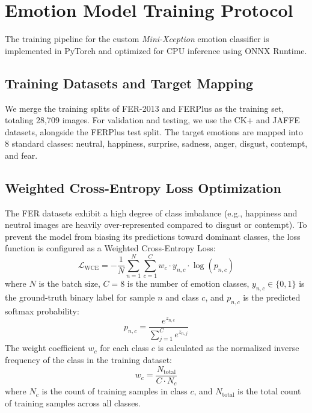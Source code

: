 \section{Emotion Model Training Protocol}
The training pipeline for the custom \textit{Mini-Xception} emotion classifier is implemented in PyTorch \cite{pytorch} and optimized for CPU inference using ONNX Runtime.

\subsection{Training Datasets and Target Mapping}
We merge the training splits of FER-2013 and FERPlus as the training set, totaling 28,709 images. For validation and testing, we use the CK+ and JAFFE datasets, alongside the FERPlus test split. The target emotions are mapped into 8 standard classes: neutral, happiness, surprise, sadness, anger, disgust, contempt, and fear.

\subsection{Weighted Cross-Entropy Loss Optimization}
The FER datasets exhibit a high degree of class imbalance (e.g., happiness and neutral images are heavily over-represented compared to disgust or contempt). To prevent the model from biasing its predictions toward dominant classes, the loss function is configured as a Weighted Cross-Entropy Loss:
\begin{equation}
    \mathcal{L}_{\text{WCE}} = - \frac{1}{N} \sum_{n=1}^N \sum_{c=1}^C w_c \cdot y_{n, c} \cdot \log(p_{n, c})
\end{equation}
where $N$ is the batch size, $C = 8$ is the number of emotion classes, $y_{n, c} \in \{0, 1\}$ is the ground-truth binary label for sample $n$ and class $c$, and $p_{n, c}$ is the predicted softmax probability:
\begin{equation}
    p_{n, c} = \frac{e^{z_{n, c}}}{\sum_{j=1}^C e^{z_{n, j}}}
\end{equation}
The weight coefficient $w_c$ for each class $c$ is calculated as the normalized inverse frequency of the class in the training dataset:
\begin{equation}
    w_c = \frac{N_{\text{total}}}{C \cdot N_c}
\end{equation}
where $N_c$ is the count of training samples in class $c$, and $N_{\text{total}}$ is the total count of training samples across all classes.

